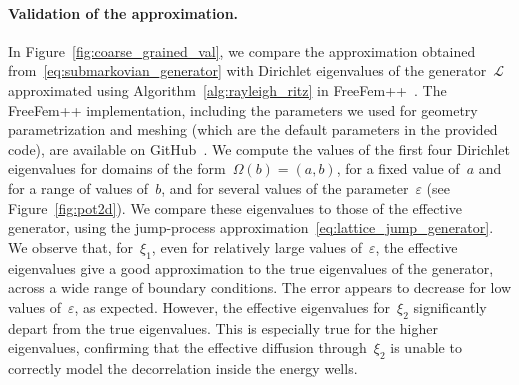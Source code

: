 \documentclass[a4]{article}
\newcommand{\cL}{\mathcal{L}}
\newcommand{\1}{\mathbbm 1}
\begin{document}
\paragraph{Validation of the approximation.}
In Figure~\ref{fig:coarse_grained_val}, we compare the approximation obtained from~\eqref{eq:submarkovian_generator} with Dirichlet eigenvalues of the generator~$\cL$ approximated using Algorithm~\ref{alg:rayleigh_ritz} in FreeFem++~\cite{freefem}.
The FreeFem++ implementation, including the parameters we used for geometry parametrization and meshing (which are the default parameters in the provided code), are available on GitHub~\cite{github}.
We compute the values of the first four Dirichlet eigenvalues for domains of the form~$\Omega(b)=\left(a,b\right)$, for a fixed value of~$a$ and for a range of values of~$b$, and for several values of the parameter~$\varepsilon$ (see Figure~\ref{fig:pot2d}).
We compare these eigenvalues to those of the effective generator, using the jump-process approximation~\eqref{eq:lattice_jump_generator}. We observe that, for~$\xi_1$, even for relatively large values of~$\varepsilon$, the effective eigenvalues give a good approximation to the true eigenvalues of the generator, across a wide range of boundary conditions.
The error appears to decrease for low values of~$\varepsilon$, as expected. However, the effective eigenvalues for~$\xi_2$ significantly depart from the true eigenvalues. This is especially true for the higher eigenvalues, confirming that the effective diffusion through~$\xi_2$ is unable to correctly model the decorrelation inside the energy wells.
\end{document}
